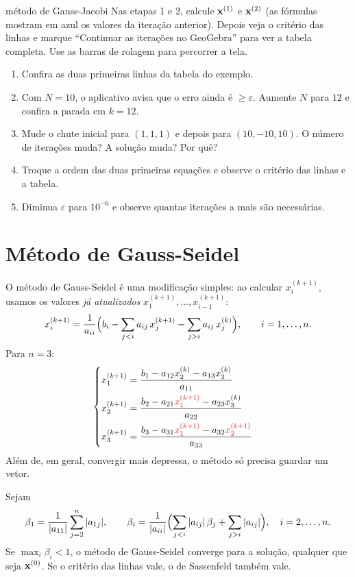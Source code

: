 \begin{atividade}{método de Gauss-Jacobi}{\arqJacobi}
Nas etapas 1 e 2, calcule $\mathbf{x}^{(1)}$ e $\mathbf{x}^{(2)}$ (as fórmulas mostram em azul os valores da
iteração anterior). Depois veja o critério das linhas e marque ``Continuar as iterações no
GeoGebra'' para ver a tabela completa. Use as barras de rolagem para percorrer a tela.
\begin{enumerate}[nosep]
  \item Confira as duas primeiras linhas da tabela do exemplo.
  \item Com $N=10$, o aplicativo avisa que o erro ainda é $\ge\varepsilon$. Aumente $N$ para
        $12$ e confira a parada em $k=12$.
  \item Mude o chute inicial para $(1,1,1)$ e depois para $(10,-10,10)$. O número de iterações
        muda? A solução muda? Por quê?
  \item Troque a ordem das duas primeiras equações e observe o critério das linhas e a tabela.
  \item Diminua $\varepsilon$ para $10^{-6}$ e observe quantas iterações a mais são necessárias.
\end{enumerate}
\end{atividade}

\section{Método de Gauss-Seidel}

O método de Gauss-Seidel é uma modificação simples: ao calcular $x_i^{(k+1)}$, usamos os
valores \emph{já atualizados} $x_1^{(k+1)},\dots,x_{i-1}^{(k+1)}$:
\[
x_i^{(k+1)}=\frac{1}{a_{ii}}\Bigl(b_i-\sum_{j<i}a_{ij}\,x_j^{(k+1)}-\sum_{j>i}a_{ij}\,x_j^{(k)}\Bigr),
\qquad i=1,\dots,n.
\]
Para $n=3$:
\[
\begin{cases}
x_1^{(k+1)}=\dfrac{b_1-a_{12}x_2^{(k)}-a_{13}x_3^{(k)}}{a_{11}}\\[8pt]
x_2^{(k+1)}=\dfrac{b_2-a_{21}\textcolor{vermelho}{x_1^{(k+1)}}-a_{23}x_3^{(k)}}{a_{22}}\\[8pt]
x_3^{(k+1)}=\dfrac{b_3-a_{31}\textcolor{vermelho}{x_1^{(k+1)}}-a_{32}\textcolor{vermelho}{x_2^{(k+1)}}}{a_{33}}
\end{cases}
\]
Além de, em geral, convergir mais depressa, o método só precisa guardar um vetor.

\begin{teorema}
Sejam
\[
\beta_1=\frac{1}{|a_{11}|}\sum_{j=2}^{n}|a_{1j}|,\qquad
\beta_i=\frac{1}{|a_{ii}|}\Bigl(\sum_{j<i}|a_{ij}|\,\beta_j+\sum_{j>i}|a_{ij}|\Bigr),\quad i=2,\dots,n.
\]
Se $\displaystyle\max_i\beta_i<1$, o método de Gauss-Seidel converge para a solução,
qualquer que seja $\mathbf{x}^{(0)}$. Se o critério das linhas vale, o de Sassenfeld também vale.
\end{teorema}

